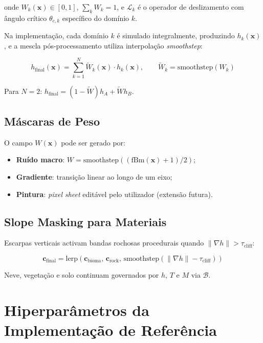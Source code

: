 \documentclass[11pt,a4paper]{article}
\begin{document}
onde $W_k(\mathbf{x}) \in [0,1]$, $\sum_k W_k = 1$, e $\mathcal{L}_k$ é o operador
de deslizamento com ângulo crítico $\theta_{c,k}$ específico do domínio $k$.

Na implementação, cada domínio $k$ é simulado integralmente, produzindo $h_k(\mathbf{x})$,
e a mescla pós-processamento utiliza interpolação \emph{smoothstep}:

\begin{equation}
  h_{\text{final}}(\mathbf{x}) = \sum_{k=1}^{N} \tilde{W}_k(\mathbf{x}) \cdot h_k(\mathbf{x}),
  \qquad \tilde{W}_k = \text{smoothstep}(W_k)
  \label{eq:blend}
\end{equation}

Para $N=2$: $h_{\text{final}} = (1 - \tilde{W}) h_A + \tilde{W} h_B$.

\subsection{Máscaras de Peso}

O campo $W(\mathbf{x})$ pode ser gerado por:
\begin{itemize}
  \item \textbf{Ruído macro}: $W = \text{smoothstep}((\text{fBm}(\mathbf{x}) + 1)/2)$;
  \item \textbf{Gradiente}: transição linear ao longo de um eixo;
  \item \textbf{Pintura}: \emph{pixel sheet} editável pelo utilizador (extensão futura).
\end{itemize}

\subsection{Slope Masking para Materiais}

Escarpas verticais activam bandas rochosas procedurais quando
$\|\nabla h\| > \tau_{\text{cliff}}$:

\begin{equation}
  \mathbf{c}_{\text{final}} = \text{lerp}(\mathbf{c}_{\text{bioma}},\, \mathbf{c}_{\text{rock}},\,
  \text{smoothstep}(\|\nabla h\| - \tau_{\text{cliff}}))
  \label{eq:slope-mask}
\end{equation}

Neve, vegetação e solo continuam governados por $h$, $T$ e $M$ via $\mathcal{B}$.

\section{Hiperparâmetros da Implementação de Referência}
\end{document}
